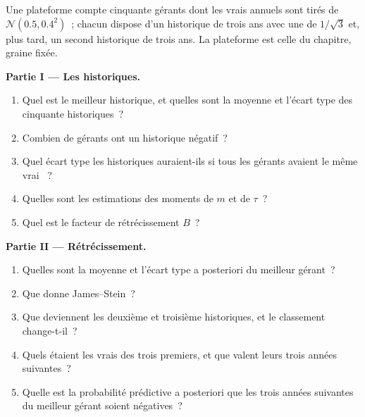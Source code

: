 \begin{problem}\label{pb:qm:bayesian-methods:1}
Une plateforme compte cinquante gérants dont les vrais  annuels sont tirés de $\mathcal N(0.5, 0.4^2)$~; chacun dispose d'un historique de trois ans avec
une  de $1/\sqrt3$ et, plus tard, un second historique de trois ans. La plateforme est celle du chapitre, graine fixée.

\medskip\noindent\textbf{Partie I --- Les historiques.}
\begin{enumerate}
\item Quel est le meilleur historique, et quelles sont la moyenne et l'écart type des cinquante historiques~?
\item Combien de gérants ont un historique négatif~?
\item Quel écart type les historiques auraient-ils si tous les gérants avaient le même vrai ~?
\item Quelles sont les estimations des moments de $m$ et de $\tau$~?
\item Quel est le facteur de rétrécissement $B$~?
\end{enumerate}

\medskip\noindent\textbf{Partie II --- Rétrécissement.}
\begin{enumerate}[resume]
\item Quelles sont la moyenne et l'écart type a posteriori du meilleur gérant~?
\item Que donne James--Stein~?
\item Que deviennent les deuxième et troisième historiques, et le classement change-t-il~?
\item Quels étaient les vrais  des trois premiers, et que valent leurs trois années suivantes~?
\item Quelle est la probabilité prédictive a posteriori que les trois années suivantes du meilleur gérant soient négatives~?
\end{enumerate}


\end{problem}
